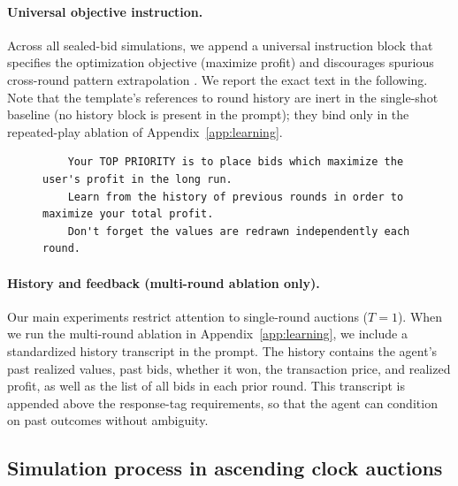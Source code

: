 \paragraph{Universal objective instruction.}
Across all sealed-bid simulations, we append a universal instruction block that specifies the optimization objective (maximize profit) and discourages spurious cross-round pattern extrapolation \citep{fish2024algorithmic}. We report the exact text in the following. Note that the template's references to round history are inert in the single-shot baseline (no history block is present in the prompt); they bind only in the repeated-play ablation of Appendix~\ref{app:learning}.

\begin{figure}[H]
\centering
\begin{minipage}{0.95\textwidth}
\begin{lstlisting}
    Your TOP PRIORITY is to place bids which maximize the user's profit in the long run.
    Learn from the history of previous rounds in order to maximize your total profit.
    Don't forget the values are redrawn independently each round.
\end{lstlisting}
\end{minipage}
\end{figure}

\paragraph{History and feedback (multi-round ablation only).}
Our main experiments restrict attention to single-round auctions ($T=1$). When we run the multi-round ablation in Appendix~\ref{app:learning}, we include a standardized history transcript in the prompt. The history contains the agent's past realized values, past bids, whether it won, the transaction price, and realized profit, as well as the list of all bids in each prior round. This transcript is appended above the response-tag requirements, so that the agent can condition on past outcomes without ambiguity.

\subsection{Simulation process in ascending clock auctions}\label{app:clock-process}

